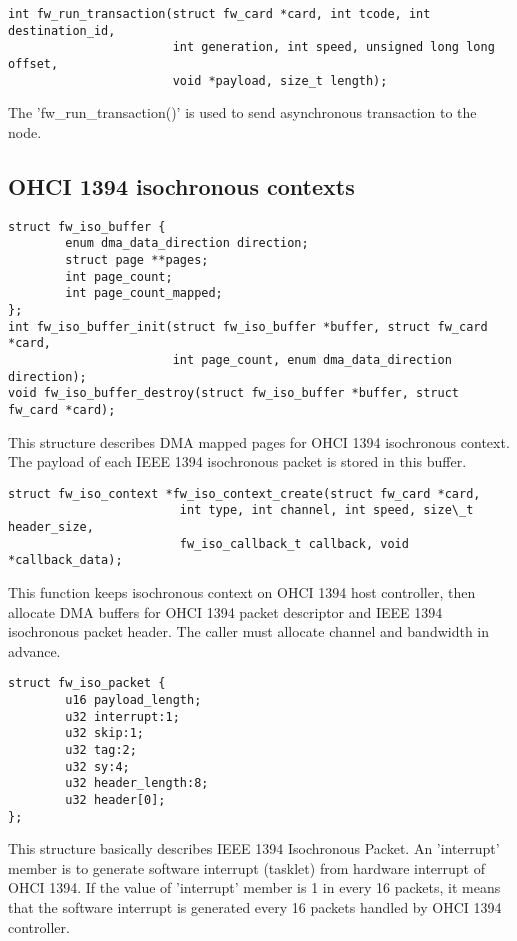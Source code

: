 \documentclass[onecolumn]{article}
\begin{document}
\begin{verbatim}
int fw_run_transaction(struct fw_card *card, int tcode, int destination_id,
                       int generation, int speed, unsigned long long offset,
                       void *payload, size_t length);
\end{verbatim}

The 'fw\_run\_transaction()' is used to send asynchronous transaction to the node.

\subsection{OHCI 1394 isochronous contexts}

\begin{verbatim}
struct fw_iso_buffer {
        enum dma_data_direction direction;
        struct page **pages;
        int page_count;
        int page_count_mapped;
};
int fw_iso_buffer_init(struct fw_iso_buffer *buffer, struct fw_card *card,
                       int page_count, enum dma_data_direction direction);
void fw_iso_buffer_destroy(struct fw_iso_buffer *buffer, struct fw_card *card);
\end{verbatim}

This structure describes DMA mapped pages for OHCI 1394 isochronous context. The payload of each IEEE 1394 isochronous packet is stored in this buffer. 

\begin{verbatim}
struct fw_iso_context *fw_iso_context_create(struct fw_card *card,
                        int type, int channel, int speed, size\_t header_size,
                        fw_iso_callback_t callback, void *callback_data);
\end{verbatim}

This function keeps isochronous context on OHCI 1394 host controller, then allocate DMA buffers for OHCI 1394 packet descriptor and IEEE 1394 isochronous packet header. The caller must allocate channel and bandwidth in advance.

\begin{verbatim}
struct fw_iso_packet {
        u16 payload_length;
        u32 interrupt:1;
        u32 skip:1;
        u32 tag:2;
        u32 sy:4;
        u32 header_length:8;
        u32 header[0];
};
\end{verbatim}

This structure basically describes IEEE 1394 Isochronous Packet. An 'interrupt' member is to generate software interrupt (tasklet) from hardware interrupt of OHCI 1394. If the value of 'interrupt' member is 1 in every 16 packets, it means that the software interrupt is generated every 16 packets handled by OHCI 1394 controller.
\end{document}
